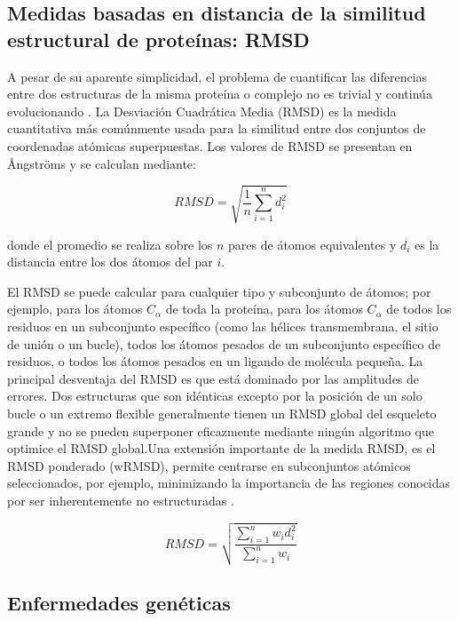 \documentclass[11pt]{article}
\begin{document}
\subsection{Medidas basadas en distancia de la similitud estructural de prote\'{i}nas: RMSD}

A pesar de su aparente simplicidad, el problema de cuantificar las diferencias entre dos estructuras de la misma proteína o complejo no es trivial y continúa evolucionando \cite{Kufareva2012}. La Desviaci\'{o}n Cuadr\'{a}tica Media (RMSD) es la medida cuantitativa m\'{a}s com\'{u}nmente usada para la similitud entre dos conjuntos de coordenadas at\'{o}micas superpuestas. Los valores de RMSD se presentan en Ångströms y se calculan mediante:

\begin{equation}
RMSD = \sqrt{\frac{1}{n} \sum_{i=1}^{n} d_i^2}
\end{equation}

donde el promedio se realiza sobre los \(n\) pares de \'{a}tomos equivalentes y \(d_i\) es la distancia entre los dos \'{a}tomos del par \(i\). 

El RMSD se puede calcular para cualquier tipo y subconjunto de \'{a}tomos; por ejemplo, para los \'{a}tomos \(C_{\alpha}\) de toda la prote\'{i}na, para los \'{a}tomos \(C_{\alpha}\) de todos los residuos en un subconjunto espec\'{i}fico (como las h\'{e}lices transmembrana, el sitio de uni\'{o}n o un bucle), todos los \'{a}tomos pesados de un subconjunto espec\'{i}fico de residuos, o todos los \'{a}tomos pesados en un ligando de mol\'{e}cula pequeña. La principal desventaja del RMSD es que est\'{a} dominado por las amplitudes de errores. Dos estructuras que son id\'{e}nticas excepto por la posici\'{o}n de un solo bucle o un extremo flexible generalmente tienen un RMSD global del esqueleto grande y no se pueden superponer eficazmente mediante ning\'{u}n algoritmo que optimice el RMSD global.Una extensi\'{o}n importante de la medida RMSD, es el RMSD ponderado (wRMSD), permite centrarse en subconjuntos at\'{o}micos seleccionados, por ejemplo, minimizando la importancia de las regiones conocidas por ser inherentemente no estructuradas \cite{Kufareva2012}.

\begin{equation}
RMSD = \sqrt{\frac{\sum_{i=1}^{n} w_{i}d_{i}^{2}}{\sum_{i=1}^{n} w_{i}}}
\end{equation}

\clearpage

\subsection{Enfermedades gen\'{e}ticas}
\end{document}

